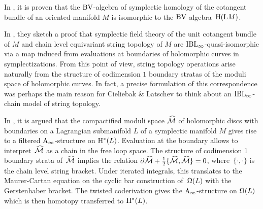 \documentclass[\MainFolder/Text.tex]{subfiles}
\begin{document}
In \cite{ViterboThm}, it is proven that the $\mathrm{BV}$-algebra of symplectic homology of the cotangent bundle of an oriented manifold $M$ is isomorphic to the $\mathrm{BV}$-algebra~$\mathrm{H}(\mathrm{L} M)$.

In \cite{Cieliebak2007}, they sketch a proof that symplectic field theory of the unit cotangent bundle of $M$ and chain level equivariant string topology of $M$ are $\mathrm{IBL}_\infty$-quasi-isomorphic via a map induced from evaluations at boundaries of holomorphic curves in symplectizations.
From this point of view, string topology operations arise naturally from the structure of codimension $1$ boundary stratas of the moduli space of holomorphic curves.
In fact, a precise formulation of this correspondence was perhaps the main reason for Cieliebak \& Latschev to think about an $\mathrm{IBL}_\infty$-chain model of string topology.

In \cite{Fukaya2006}, it is argued that the compactified moduli space $\widehat{\mathcal{M}}$ of holomorphic discs with boundaries on a Lagrangian submanifold $L$ of a symplectic manifold $M$ gives rise to a filtered $\mathrm{A}_\infty$-structure on $\mathrm{H}^*(L)$.
Evaluation at the boundary allows to interpret~$\widehat{\mathcal{M}}$ as a chain in the free loop space.
The structure of codimension 1 boundary strata of~$\widehat{\mathcal{M}}$ implies the relation $\partial \widehat{\mathcal{M}} + \frac{1}{2}\{\widehat{\mathcal{M}},\widehat{\mathcal{M}}\} = 0$, where~$\{\cdot,\cdot\}$ is the chain level string bracket.
Under iterated integrals, this translates to the Maurer-Cartan equation on the cyclic bar construction of~$\Omega(L)$ with the Gerstenhaber bracket.
The twisted coderivation gives the $\mathrm{A}_\infty$-structure on $\Omega(L)$ which is then homotopy transferred to $\mathrm{H}^*(L)$. 

%
%
\end{document}
